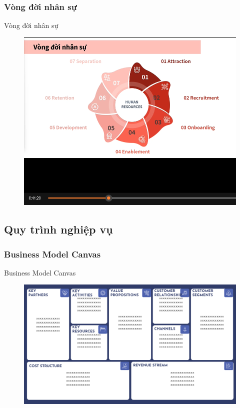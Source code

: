 \documentclass{beamer}
\begin{document}
\subsubsection{Vòng đời nhân sự}
\begin{frame}{Vòng đời nhân sự}
\begin{figure}[H]
\centering
\includegraphics[scale = 0.3]{pictures/Vòng đời nhân sự.png}
\end{figure}
\end{frame}
\subsection{Quy trình nghiệp vụ}
\subsubsection{Business Model Canvas}
\begin{frame}{Business Model Canvas}
\begin{figure}[H]
\centering
\includegraphics[scale = 0.3]{pictures/Business Model Canvas.png}
\end{figure}
\end{frame}
\end{document}
